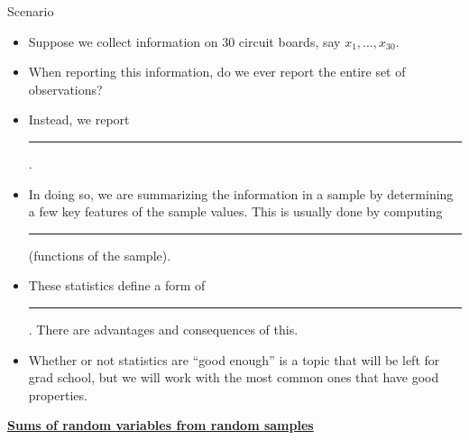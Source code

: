 \documentclass{article}
\newcommand{\bu}[1]{\textbf{\ul{#1}}}				%
\newcommand{\blankul}[1]{\rule[-1.5mm]{#1}{0.15mm}}	%
\newcommand{\vecn}[2]{#1_1, \ldots, #1_{#2}}	%
\begin{document}
Scenario\bigskip
\begin{itemize}
    \item Suppose we collect information on 30 circuit boards, say $\vecn{x}{30}$.
    \item[] When reporting this information, do we ever report the entire set of observations?
    \item Instead, we report \blankul{4cm}.
    \item[] In doing so, we are summarizing the information in a sample by determining a few key features of the sample values. This is usually done by computing \blankul{3cm} (functions of the sample).
    \item These statistics define a form of \blankul{4cm}. There are advantages and consequences of this.
    \item[] Whether or not statistics are ``good enough'' is a topic that will be left for grad school, but we will work with the most common ones that have good properties.
\end{itemize}\bigskip

\bu{Sums of random variables from random samples}\bigskip
\end{document}
